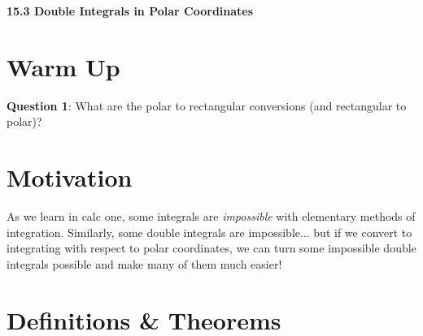 \documentclass[11pt]{article}
\newcommand{\vs}{\vspace*{.1in}}
\begin{document}
\begin{LARGE}\begin{center}\bf 15.3 Double Integrals in Polar Coordinates\end{center}
\end{LARGE}

\vs\vs



\section{Warm Up}
\textbf{Question 1}: What are the polar to rectangular conversions (and rectangular to polar)?



\section{Motivation}
As we learn in calc one, some integrals are \emph{impossible} with elementary methods of integration. Similarly, some double integrals are impossible... but if we convert to integrating with respect to polar coordinates, we can turn some impossible double integrals possible and make many of them much easier! 


\section{Definitions \& Theorems}
\end{document}
